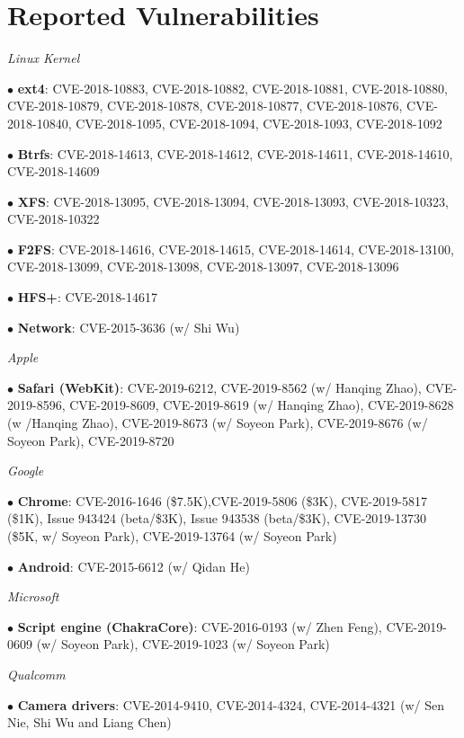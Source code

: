 \section*{Reported Vulnerabilities}
\begin{description}
\item {\emph{Linux Kernel}}
    \item $\bullet$ \textbf{ext4}: CVE-2018-10883, CVE-2018-10882, CVE-2018-10881, CVE-2018-10880, CVE-2018-10879, CVE-2018-10878, CVE-2018-10877, CVE-2018-10876, CVE-2018-10840, CVE-2018-1095, CVE-2018-1094, CVE-2018-1093, CVE-2018-1092
    \item $\bullet$ \textbf{Btrfs}: CVE-2018-14613, CVE-2018-14612, CVE-2018-14611, CVE-2018-14610, CVE-2018-14609
    \item $\bullet$ \textbf{XFS}: CVE-2018-13095, CVE-2018-13094, CVE-2018-13093, CVE-2018-10323, CVE-2018-10322
    \item $\bullet$ \textbf{F2FS}: CVE-2018-14616, CVE-2018-14615, CVE-2018-14614, CVE-2018-13100, CVE-2018-13099, CVE-2018-13098, CVE-2018-13097, CVE-2018-13096
	\item $\bullet$ \textbf{HFS+}: CVE-2018-14617
	\item $\bullet$ \textbf{Network}: CVE-2015-3636 (w/ Shi Wu)

\item {\emph{Apple}}
\item $\bullet$ \textbf{Safari (WebKit)}: CVE-2019-6212,
CVE-2019-8562 (w/ Hanqing Zhao), CVE-2019-8596, CVE-2019-8609,
CVE-2019-8619 (w/ Hanqing Zhao), CVE-2019-8628 (w /Hanqing
Zhao), CVE-2019-8673 (w/ Soyeon Park), CVE-2019-8676 (w/ Soyeon
Park), CVE-2019-8720

\item {\emph{Google}}
\item $\bullet$ \textbf{Chrome}: CVE-2016-1646 (\$7.5K),CVE-2019-5806 (\$3K), CVE-2019-5817 (\$1K), Issue 943424 (beta/\$3K), Issue 943538 (beta/\$3K), CVE-2019-13730 (\$5K, w/ Soyeon Park), CVE-2019-13764 (w/ Soyeon Park)
    \item $\bullet$ \textbf{Android}: CVE-2015-6612 (w/ Qidan He)

\item {\emph{Microsoft}}
	\item $\bullet$ \textbf{Script engine (ChakraCore)}: CVE-2016-0193 (w/ Zhen Feng), CVE-2019-0609 (w/ Soyeon Park), CVE-2019-1023 (w/ Soyeon Park)

\item {\emph{Qualcomm}}
	\item $\bullet$ \textbf{Camera drivers}: CVE-2014-9410, CVE-2014-4324, CVE-2014-4321 (w/ Sen Nie, Shi Wu and Liang Chen)
\end{description}

